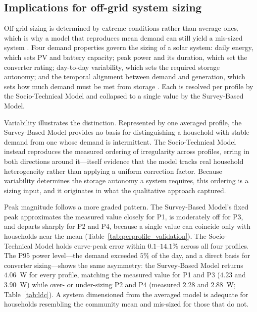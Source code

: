 \documentclass[final,3p,times,onecolumn]{elsarticle}
\begin{document}
\subsection{Implications for off-grid system sizing}
\label{sec:sizing}

Off-grid sizing is determined by extreme conditions rather than average ones, which is why a model that reproduces mean demand can still yield a mis-sized system \citep{sizing-consequences}. Four demand properties govern the sizing of a solar system: daily energy, which sets PV and battery capacity; peak power and its duration, which set the converter rating; day-to-day variability, which sets the required storage autonomy; and the temporal alignment between demand and generation, which sets how much demand must be met from storage \citep{sizing-methodology}. Each is resolved per profile by the Socio-Technical Model and collapsed to a single value by the Survey-Based Model.

Variability illustrates the distinction. Represented by one averaged profile, the Survey-Based Model provides no basis for distinguishing a household with stable demand from one whose demand is intermittent. The Socio-Technical Model instead reproduces the measured ordering of irregularity across profiles, erring in both directions around it---itself evidence that the model tracks real household heterogeneity rather than applying a uniform correction factor. Because variability determines the storage autonomy a system requires, this ordering is a sizing input, and it originates in what the qualitative approach captured.

Peak magnitude follows a more graded pattern. The Survey-Based Model's fixed peak approximates the measured value closely for P1, is moderately off for P3, and departs sharply for P2 and P4, because a single value can coincide only with households near the mean (Table~\ref{tab:perprofile_validation}). The Socio-Technical Model holds curve-peak error within $0.1$--$14.1\%$ across all four profiles. The P95 power level---the demand exceeded $5\%$ of the day, and a direct basis for converter sizing---shows the same asymmetry: the Survey-Based Model returns $4.06$~W for every profile, matching the measured value for P1 and P3 ($4.23$ and $3.90$~W) while over- or under-sizing P2 and P4 (measured $2.28$ and $2.88$~W; Table~\ref{tab:ldc}). A system dimensioned from the averaged model is adequate for households resembling the community mean and mis-sized for those that do not.
\end{document}

